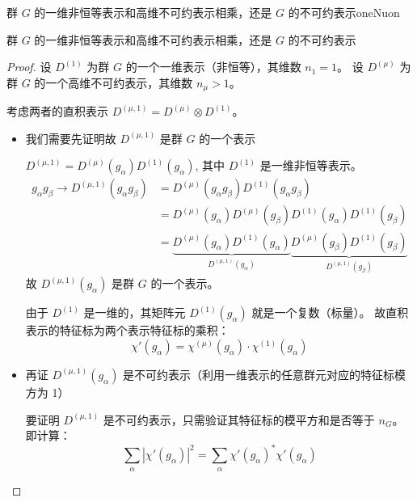 \begin{corollary}{群 $G$ 的一维非恒等表示和高维不可约表示相乘，还是 $G$ 的不可约表示}{oneNuon}
    
  群 $G$ 的一维非恒等表示和高维不可约表示相乘，还是 $G$ 的不可约表示
\end{corollary}

\begin{proof}
    
    设 $D^{(1)}$ 为群 $G$ 的一个一维表示（非恒等），其维数 $n_1 = 1$。
    设 $D^{(\mu)}$ 为群 $G$ 的一个高维不可约表示，其维数 $n_\mu > 1$。
    
    考虑两者的直积表示 $D^{(\mu,1)} = D^{(\mu)}  \otimes  D^{(1)} $。
    
    

\begin{itemize}
    \item 我们需要先证明故 $D^{(\mu,1)}$ 是群 $G$ 的一个表示

    $D^{(\mu,1)} = D^{(\mu)}(g_\alpha) D^{(1)}(g_\alpha)$, 其中 $D^{(1)}$ 是一维非恒等表示。
\begin{equation}
    \begin{aligned}
        g_\alpha g_\beta \to D^{(\mu,1)}(g_\alpha g_\beta) &= D^{(\mu)}(g_\alpha g_\beta) D^{(1)}(g_\alpha g_\beta) \\
        &= D^{(\mu)}(g_\alpha) D^{(\mu)}(g_\beta) D^{(1)}(g_\alpha) D^{(1)}(g_\beta) \\
        &= \underbrace{D^{(\mu)}(g_\alpha) D^{(1)}(g_\alpha)}_{D^{(\mu,1)}(g_\alpha)} \underbrace{D^{(\mu)}(g_\beta) D^{(1)}(g_\beta)}_{D^{(\mu,1)}(g_\beta)}
    \end{aligned}
\end{equation}
故 $D^{(\mu,1)}(g_\alpha)$ 是群 $G$ 的一个表示。

由于 $D^{(1)}$ 是一维的，其矩阵元 $D^{(1)}(g_\alpha)$ 就是一个复数（标量）。
    故直积表示的特征标为两个表示特征标的乘积：
    \begin{equation}
        \chi'(g_\alpha) =   \chi^{(\mu)}(g_\alpha)\cdot   \chi^{(1)}(g_\alpha)
    \end{equation}

  \item 再证 $D^{(\mu,1)}(g_\alpha)$ 是不可约表示（利用一维表示的任意群元对应的特征标模方为 1）

    要证明 $D^{(\mu,1)}$ 是不可约表示，只需验证其特征标的模平方和是否等于 $n_G$。
    即计算：
    \begin{equation}
        \sum_{\alpha} |\chi'(g_\alpha)|^2 = \sum_{\alpha} \chi'(g_\alpha)^* \chi'(g_\alpha)
    \end{equation}
    

\end{itemize}
\end{proof}
